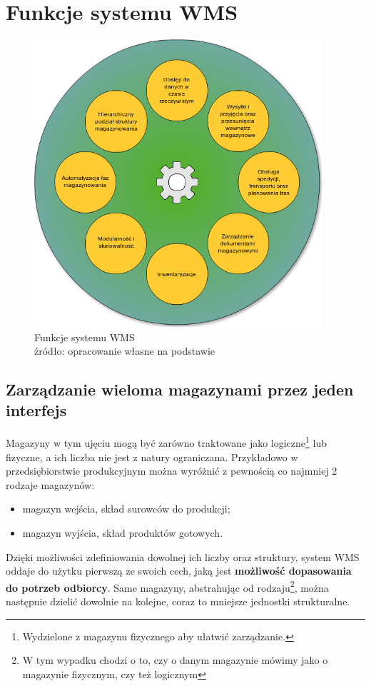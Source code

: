 \section{Funkcje systemu WMS}
	\begin{figure}[H]
		\begin{center}
			\includegraphics[width=0.95\textwidth]{images/wms_functionality_2}
		\end{center}
		\caption[Funkcjonalność systemu WMS]{
			Funkcje systemu WMS\\
			źródło: opracowanie własne na podstawie \cite{logistyka_w_przedsiebiorstwie}
		}
		\label{fig:c5:wms_basic_functionality}
	\end{figure}
	\subsection{Zarządzanie wieloma magazynami przez jeden interfejs}
		Magazyny w tym ujęciu mogą być zarówno traktowane jako logiczne\footnote{Wydzielone z magazynu fizycznego
		aby ułatwić zarządzanie.} lub fizyczne, a ich liczba nie jest z natury ograniczana. Przykładowo w przedsiębiorstwie
		produkcyjnym można wyróżnić z pewnością co najmniej 2 rodzaje magazynów:
		\begin{itemize}
			\item magazyn wejścia, skład surowców do produkcji;
			\item magazyn wyjścia, skład produktów gotowych.
		\end{itemize}			
		Dzięki możliwości zdefiniowania dowolnej ich liczby oraz struktury, system WMS oddaje do użytku
		pierwszą ze swoich cech, jaką jest \textbf{możliwość dopasowania do potrzeb odbiorcy}.
		Same magazyny, abstrahując od rodzaju\footnote{W tym wypadku chodzi o to, czy o danym magazynie mówimy jako
		o magazynie fizycznym, czy też logicznym}, można następnie dzielić dowolnie na kolejne, coraz to mniejsze 
		jednostki strukturalne.
